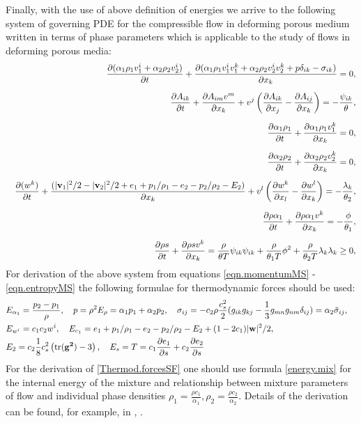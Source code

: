 \documentclass[3p,times]{elsarticle}
\newcommand{\tr}{\textnormal{tr}}
\begin{document}
Finally, with the use of above definition of energies we arrive to the following system of governing PDE for the compressible flow in deforming porous medium written in terms of phase parameters which is applicable to the study of flows in deforming porous media:
\begin{eqnarray}\label{eqn.PV}
&&\displaystyle\frac{\partial (\alpha_1\rho_1v^i_1+\alpha_2\rho_2v^i_2)}{\partial t}+
\frac{\partial(\alpha_1\rho_1v^i_1v^k_1+\alpha_2\rho_2v^i_2v^k_2 +p\delta_{ik}-\sigma_{ik})}{\partial x_k}=0, 
\label{eqn.momentumPV}\\[2mm]
&&\displaystyle\frac{\partial A_{i k}}{\partial t}+\frac{\partial A_{im} 
	v^m}{\partial x_k}+v^j\left(\frac{\partial A_{ik}}{\partial 
	x_j}-\frac{\partial A_{ij}}{\partial x_k}\right)
=-\dfrac{ \psi_{ik} }{\theta},\label{eqn.deformationPV}\\[2mm]
&& \frac{\partial \alpha_1\rho_1}{\partial t}+\frac{\partial \alpha_1\rho_1 v^k_1}{\partial 
	x_k}=0,\label{eqn.contiPV1}\\[2mm]
&& \frac{\partial \alpha_2\rho_2}{\partial t}+\frac{\partial \alpha_2\rho_2 v^k_2}{\partial 
	x_k}=0,\label{eqn.contiPV2}\\[2mm]
&&\displaystyle\frac{\partial (w^k)}{\partial t}+\frac{(|{\bf v}_1|^2/2-|{\bf v}_2|^2/2+e_1+p_1/\rho_1-e_2-p_2/\rho_2-E_2)}{\partial x_k}
+v^l\left(\frac{\partial w^k}{\partial x_l}-
\frac{\partial w^l}{\partial x_k}\right)
=-\dfrac{ \lambda_{k} }{\theta_2}, \label{eqn.relvelPV}\\[2mm]
&& \frac{\partial \rho \alpha_1}{\partial t}+\frac{\partial \rho \alpha_1 v^k }{\partial 
	x_k}=-\frac{\phi}{\theta_1},\label{eqn.alphaPV}\\[2mm]
&&\displaystyle\frac{\partial \rho s}{\partial t}+\frac{\partial \rho 
	s v^k }{\partial x_k}=\dfrac{\rho}{\theta T}\psi_{ik} \psi_{ik}+
\dfrac{\rho}{\theta_1 T}\phi^2 +
\dfrac{\rho}{\theta_2 T}\lambda_k \lambda_k \geq0, 
\label{eqn.entropyPV}
\end{eqnarray}
For derivation of the above system from equations \eqref{eqn.momentumMS} - \eqref{eqn.entropyMS} the following formulae for thermodynamic forces should be used:
\begin{eqnarray} \label{Thermod.forcesSF}
& E_{\alpha_1}=\frac{p_2-p_1}{\rho}, \quad p=\rho^2E_\rho={\alpha_1p_1+\alpha_2p_2}, 
\quad \sigma_{ij}=-c_2 \rho \frac{c_s^2}{2}({g_{ik}g_{kj}-\frac{1}{3}g_{mn}g_{nm}\delta_{ij}})=
\alpha_2 \tilde \sigma_{ij}, 
\quad  \nonumber \\
&E_{w^i}=c_1c_2 w^i, \quad E_{c_1}=e_1+p_1/\rho_1-e_2-p_2/\rho_2-E_2+(1-2c_1)|{\bf w}|^2/2, \\ 
&E_2=c_2 \frac{1}{8}c_s^2\left(\tr({{\bf g^2}})-3\right), \quad E_s=T=c_1\frac{\partial e_1}{\partial s}+c_2\frac{\partial e_2}{\partial s} \nonumber
\end{eqnarray}  
For the derivation of \eqref{Thermod.forcesSF} one should use formula \eqref{energy.mix} for the internal energy of the mixture and relationship between mixture parameters of flow and individual phase densities $\rho_1=\frac{\rho c_1}{\alpha_1}, \rho_2=\frac{\rho c_2}{\alpha_2}$.
Details of the derivation can be found, for example, in \cite{Romenski2010}, \cite{Romenski2015}. 
 
\end{document}
